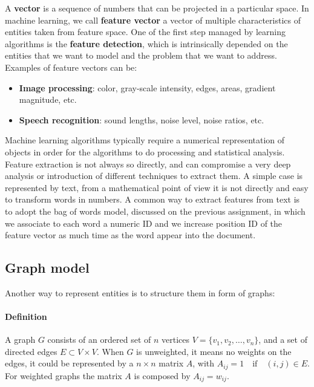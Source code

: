 \documentclass[11pt,a4paper]{article}
\begin{document}
A \textbf{vector} is a sequence of numbers that can be projected in a particular space. In machine learning, we call \textbf{feature vector} a vector of multiple characteristics of entities taken from feature space. One of the first step managed by learning algorithms is the \textbf{feature detection}, which is intrinsically depended on the entities that we want to model and the problem that we want to address. Examples of feature vectors can be:
\begin{itemize}
	\item \textbf{Image processing}: color, gray-scale intensity, edges, areas, gradient magnitude, etc.
	\item \textbf{Speech recognition}: sound lengths, noise level, noise ratios, etc.
\end{itemize} 
Machine learning algorithms typically require a numerical representation of objects in order for the algorithms to do processing and statistical analysis.
Feature extraction is not always so directly, and can compromise a very deep analysis or introduction of different techniques to extract them. A simple case is represented by text, from a mathematical point of view it is not directly and easy to transform words in numbers. A common way to extract features from text is to adopt the bag of words model, discussed on the previous assignment, in which we associate to each word a numeric ID and we increase position ID of the feature vector as much time as the word appear into the document. \\

\subsection{Graph model} 
\label{sec:graph_model}
Another way to represent entities is to structure them in form of graphs:

\paragraph{Definition} A graph $G$ consists of an ordered set of $n$ vertices $V = \{v_1, v_2,\dots, v_n\}$, and a set of directed edges $E \subset V \times V$. When $G$ is unweighted, it means no weights on the edges, it could be represented by a $n\times n$ matrix $A$, with $A_{ij} = 1 \quad \text{if}\quad (i,j)\in E$. For weighted graphs the matrix $A$ is composed by $A_{ij} = w_{ij}$.\\
\end{document}
